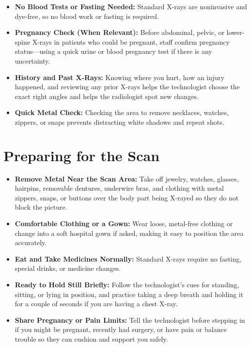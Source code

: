\begin{itemize}
    \item \textbf{No Blood Tests or Fasting Needed:} Standard X-rays are noninvasive and dye-free, so no blood work or fasting is required.
    \item \textbf{Pregnancy Check (When Relevant):} Before abdominal, pelvic, or lower-spine X-rays in patients who could be pregnant, staff confirm pregnancy status---using a quick urine or blood pregnancy test if there is any uncertainty.
    \item \textbf{History and Past X-Rays:} Knowing where you hurt, how an injury happened, and reviewing any prior X-rays helps the technologist choose the exact right angles and helps the radiologist spot new changes.
    \item \textbf{Quick Metal Check:} Checking the area to remove necklaces, watches, zippers, or snaps prevents distracting white shadows and repeat shots.
\end{itemize}

\section{Preparing for the Scan}

\begin{itemize}
    \item \textbf{Remove Metal Near the Scan Area:} Take off jewelry, watches, glasses, hairpins, removable dentures, underwire bras, and clothing with metal zippers, snaps, or buttons over the body part being X-rayed so they do not block the picture.
    \item \textbf{Comfortable Clothing or a Gown:} Wear loose, metal-free clothing or change into a soft hospital gown if asked, making it easy to position the area accurately.
    \item \textbf{Eat and Take Medicines Normally:} Standard X-rays require no fasting, special drinks, or medicine changes.
    \item \textbf{Ready to Hold Still Briefly:} Follow the technologist's cues for standing, sitting, or lying in position, and practice taking a deep breath and holding it for a couple of seconds if you are having a chest X-ray.
    \item \textbf{Share Pregnancy or Pain Limits:} Tell the technologist before stepping in if you might be pregnant, recently had surgery, or have pain or balance trouble so they can cushion and support you safely.
\end{itemize}

